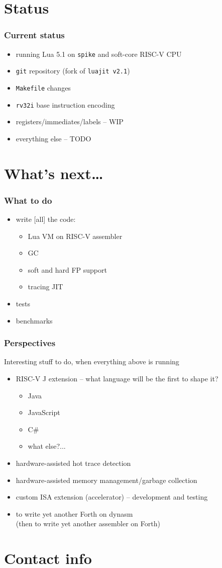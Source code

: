 \section{Status}

\begin{frame}
\frametitle{Current status}
\begin{itemize}
\item running Lua 5.1 on \texttt{spike} and soft-core RISC-V CPU
\item \texttt{git} repository (fork of \texttt{luajit v2.1})
\item \texttt{Makefile} changes
\item \texttt{rv32i} base instruction encoding
\item registers/immediates/labels -- WIP
\item everything else -- TODO
\end{itemize}
\end{frame}

\section{What's next\dots}

\begin{frame}
\frametitle{What to do}
\begin{itemize}
\item write [all] the code:
\begin{itemize}
\item Lua VM on RISC-V assembler
\item GC
\item soft and hard FP support
\item tracing JIT
\end{itemize}
\item tests
\item benchmarks
\end{itemize}
\end{frame}

\begin{frame}
\frametitle{Perspectives}
Interesting stuff to do, when everything above is running
\begin{itemize}
  \item RISC-V J extension -- what language will be the first to shape it?
  \begin{itemize}
    \item Java
    \item JavaScript
    \item C\#
    \item what else?...
  \end{itemize}
  \item hardware-assisted hot trace detection
  \item hardware-assisted memory management/garbage collection
  \item custom ISA extension (accelerator) -- development and testing
  \item to write yet another Forth on dynasm\\
  (then to write yet another assembler on Forth)
\end{itemize}
\end{frame}

\section{Contact info}



